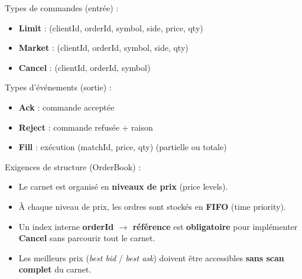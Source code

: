 \documentclass[11pt,a4paper]{article}
\begin{document}
\noindent Types de commandes (entrée) :
\begin{itemize}
  \item \textbf{Limit} : (clientId, orderId, symbol, side, price, qty)
  \item \textbf{Market} : (clientId, orderId, symbol, side, qty)
  \item \textbf{Cancel} : (clientId, orderId, symbol)
\end{itemize}

\noindent Types d’événements (sortie) :
\begin{itemize}
  \item \textbf{Ack} : commande acceptée
  \item \textbf{Reject} : commande refusée + raison
  \item \textbf{Fill} : exécution (matchId, price, qty) (partielle ou totale)
\end{itemize}

\noindent Exigences de structure (OrderBook) :
\begin{itemize}
  \item Le carnet est organisé en \textbf{niveaux de prix} (price levels).
  \item À chaque niveau de prix, les ordres sont stockés en \textbf{FIFO} (time priority).
  \item Un index interne \textbf{orderId $\rightarrow$ référence} est \textbf{obligatoire} pour implémenter
        \textbf{Cancel} sans parcourir tout le carnet.
  \item Les meilleurs prix (\textit{best bid} / \textit{best ask}) doivent être accessibles \textbf{sans scan complet}
        du carnet.
\end{itemize}
\end{document}
